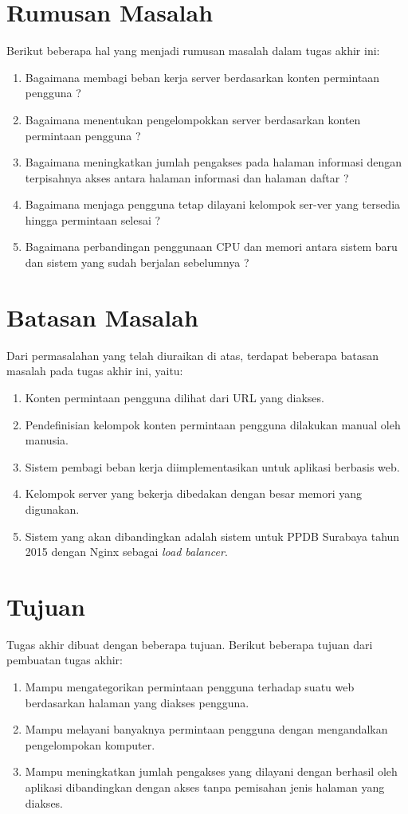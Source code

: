 \documentclass{ta-its}
\begin{document}
            
        \section{Rumusan Masalah}
			Berikut beberapa hal yang menjadi rumusan masalah dalam tugas akhir ini:
			\begin{enumerate}
			\item Bagaimana membagi beban kerja server berdasarkan konten permintaan pengguna ?
			\item Bagaimana menentukan pengelompokkan server berdasarkan konten permintaan pengguna ?
			\item Bagaimana meningkatkan jumlah pengakses pada halaman informasi dengan terpisahnya akses antara halaman informasi dan halaman daftar ?
			\item Bagaimana menjaga pengguna tetap dilayani kelompok ser-ver yang tersedia hingga permintaan selesai ?
			\item Bagaimana perbandingan penggunaan CPU dan memori antara sistem baru dan sistem yang sudah berjalan sebelumnya ?
			\end{enumerate}

        \section{Batasan Masalah}
			Dari permasalahan yang telah diuraikan di atas, terdapat beberapa batasan masalah pada tugas akhir ini, yaitu:
			\begin{enumerate}
			\item Konten permintaan pengguna dilihat dari URL yang diakses.
			\item Pendefinisian kelompok konten permintaan pengguna dilakukan manual oleh manusia.
			\item Sistem pembagi beban kerja diimplementasikan untuk aplikasi berbasis web.
			\item Kelompok server yang bekerja dibedakan dengan besar memori yang digunakan.
			\item Sistem yang akan dibandingkan adalah sistem untuk PPDB Surabaya tahun 2015 dengan Nginx sebagai \textit{load balancer}.
			\end{enumerate}

        \section{Tujuan}
			Tugas akhir dibuat dengan beberapa tujuan. Berikut beberapa tujuan dari pembuatan tugas akhir:
			\begin{enumerate}
			\item Mampu mengategorikan permintaan pengguna terhadap suatu web berdasarkan halaman yang diakses pengguna.
			\item Mampu melayani banyaknya permintaan pengguna dengan mengandalkan pengelompokan komputer.
			\item Mampu meningkatkan jumlah pengakses yang dilayani dengan berhasil oleh aplikasi dibandingkan dengan akses tanpa pemisahan jenis halaman yang diakses.
			\end{enumerate}
\end{document}
